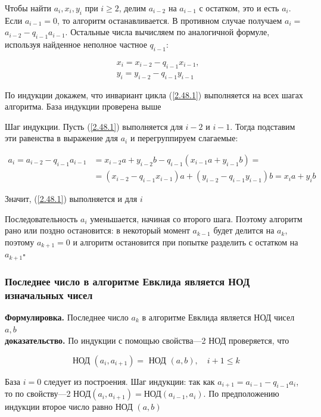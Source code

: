 \documentclass[a4paper]{article}
\newcommand{\qed}{\hfill$\square$}
\begin{document}
Чтобы найти $a_{i}, x_{i}, y_{i}$ при $i \geqslant 2$, делим $a_{i-2}$ на $a_{i-1}$ с остатком, это и есть $a_{i}$. Если $a_{i-1}=0$, то алгоритм останавливается. В противном случае получаем $a_{i}=$ $a_{i-2}-q_{i-1} a_{i-1}$. Остальные числа вычисляем по аналогичной формуле, используя найденное неполное частное $q_{i-1}$:

$$
\begin{aligned}
& x_{i}=x_{i-2}-q_{i-1} x_{i-1}, \\
& y_{i}=y_{i-2}-q_{i-1} y_{i-1}
\end{aligned}
$$

По индукции докажем, что инвариант цикла (\ref{2.48.1}) выполняется на всех шагах алгоритма. База индукции проверена выше

Шаг индукции. Пусть (\ref{2.48.1}) выполняется для $i-2$ и $i-1$. Тогда подставим эти равенства в выражение для $a_{i}$ и перегруппируем слагаемые:

$$
\begin{aligned}
a_{i}=a_{i-2}-q_{i-1} a_{i-1} & =x_{i-2} a+y_{i-2} b-q_{i-1}\left(x_{i-1} a+y_{i-1} b\right)= \\
& =\left(x_{i-2}-q_{i-1} x_{i-1}\right) a+\left(y_{i-2}-q_{i-1} y_{i-1}\right) b=x_{i} a+y_{i} b
\end{aligned}
$$

Значит, (\ref{2.48.1}) выполняется и для $i$

Последовательность $a_{i}$ уменьшается, начиная со второго шага. Поэтому алгоритм рано или поздно остановится: в некоторый момент $a_{k-1}$ будет делится на $a_{k}$, поэтому $a_{k+1}=0$ и алгоритм остановится при попытке разделить с остатком на $a_{k+1}$\qed

\subsubsection*{Последнее число в алгоритме Евклида является НОД изначальных чисел}
\textbf{Формулировка.} Последнее число $a_{k}$ в алгоритме Евклида является НОД чисел $a, b$\\[2mm]
\indent\textbf{доказательство.} По индукции с помощью свойства—2 НОД проверяется, что

$$
\text { НОД }\left(a_{i}, a_{i+1}\right)=\text { НОД }(a, b), \quad i+1 \leqslant k
$$

База $i=0$ следует из построения. Шаг индукции: так как $a_{i+1}=a_{i-1}-q_{i-1} a_{i}$, то по свойству—2 $\text{НОД}\left(a_{i}, a_{i+1}\right)=\text{НОД}\left(a_{i-1}, a_{i}\right)$. По предположению индукции второе число равно НОД $(a, b)$
\end{document}
